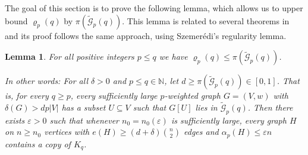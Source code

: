 \documentclass[10pt,a4paper]{article}
\newtheorem{lemma}[theorem]{Lemma}
\theoremstyle{definition}
\def\eps{{\varepsilon}}
\newcommand{\cG}{\mathcal{G}}
\begin{document}



The goal of this section is to prove the following  lemma, which allows us to upper bound $\varrho_p(q)$ by $\pi(\widetilde{\cG}_p(q))$. 
This lemma is related to several theorems in~\cite{EHSSSz} and its proof follows the same approach, using Szemer\'edi's regularity lemma.


\begin{lemma}\label{reduce}
	For all positive integers $p \leq q$ we have $\varrho_p(q) \leq \pi(\widetilde{\cG}_p(q))$.
	
	\medskip
	In other words:
	For all $\delta>0$ and $p \leq q \in \mathbb{N}$, let $d\ge \pi(\widetilde{\cG}_p(q))\in [0,1]$. That is, for every $q \geq p$,
	every sufficiently large $p$-weighted graph $G=(V,w)$ with $\delta(G) > dp|V|$ has a subset $U \subseteq V$ such that $G[U]$ lies in $\widetilde{\cG}_p(q)$. 
	Then there exists $\eps>0$ such that whenever $n_0=n_0(\eps)$ is sufficiently large,
	every graph $H$ on $n \geq n_0$ vertices with $e(H) \geq (d+\delta)\binom{n}{2}$ edges and $\alpha_p(H) \leq \eps n$ contains a copy of $K_q$.
\end{lemma}

\end{document}
